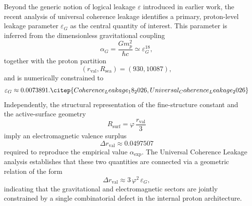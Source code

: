 \documentclass[11pt,a4paper]{article}
\begin{document}
Beyond the generic notion of logical leakage $\varepsilon$ introduced in earlier work, the recent analysis of universal coherence leakage identifies a primary, proton-level leakage parameter $\varepsilon_G$ as the central quantity of interest.\citep{Universal_Coherence_Leakage_2026}
This parameter is inferred from the dimensionless gravitational coupling
\[
\alpha_G = \frac{G m_p^2}{\hbar c} \simeq \varepsilon_G^{18},
\]
together with the proton partition
\[
(r_{\mathrm{val}}, R_{\mathrm{sea}}) = (930, 10087),
\]
and is numerically constrained to
\[
\varepsilon_G \approx 0.0073891.\citep{Coherence_Leakage_18_2026,Universal_Coherence_Leakage_2026}
\]
Independently, the structural representation of the fine-structure constant and the active-surface geometry
\[
R_{\mathrm{surf}} = \varphi\,\frac{r_{\mathrm{val}}}{3}
\]
imply an electromagnetic valence surplus
\[
\Delta r_{\mathrm{val}} \approx 0.0497507
\]
required to reproduce the empirical value $\alpha_{\exp}$.\citep{Alpha_PDL_v2_2026}
The Universal Coherence Leakage analysis establishes that these two quantities are connected via a geometric relation of the form
\[
\Delta r_{\mathrm{val}} \approx 3\,\varphi^2\,\varepsilon_G,
\]
indicating that the gravitational and electromagnetic sectors are jointly constrained by a single combinatorial defect in the internal proton architecture.
\end{document}
